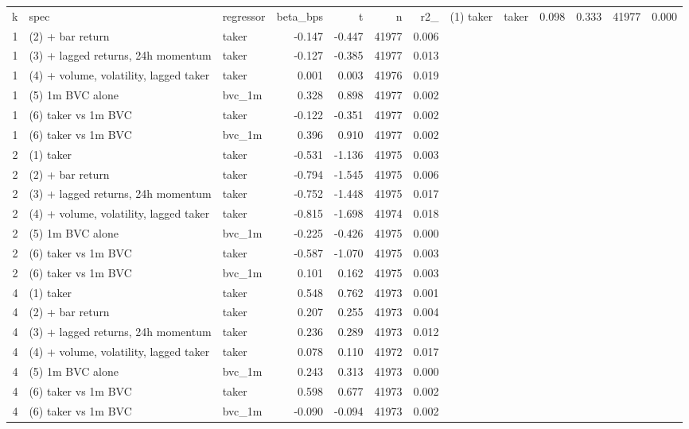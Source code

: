 \begin{tabular}{rllrrrr}
\toprule
k & spec & regressor & beta_bps & t & n & r2_%
 & (1) taker & taker & 0.098 & 0.333 & 41977 & 0.000 \\
1 & (2) + bar return & taker & -0.147 & -0.447 & 41977 & 0.006 \\
1 & (3) + lagged returns, 24h momentum & taker & -0.127 & -0.385 & 41977 & 0.013 \\
1 & (4) + volume, volatility, lagged taker & taker & 0.001 & 0.003 & 41976 & 0.019 \\
1 & (5) 1m BVC alone & bvc_1m & 0.328 & 0.898 & 41977 & 0.002 \\
1 & (6) taker vs 1m BVC & taker & -0.122 & -0.351 & 41977 & 0.002 \\
1 & (6) taker vs 1m BVC & bvc_1m & 0.396 & 0.910 & 41977 & 0.002 \\
2 & (1) taker & taker & -0.531 & -1.136 & 41975 & 0.003 \\
2 & (2) + bar return & taker & -0.794 & -1.545 & 41975 & 0.006 \\
2 & (3) + lagged returns, 24h momentum & taker & -0.752 & -1.448 & 41975 & 0.017 \\
2 & (4) + volume, volatility, lagged taker & taker & -0.815 & -1.698 & 41974 & 0.018 \\
2 & (5) 1m BVC alone & bvc_1m & -0.225 & -0.426 & 41975 & 0.000 \\
2 & (6) taker vs 1m BVC & taker & -0.587 & -1.070 & 41975 & 0.003 \\
2 & (6) taker vs 1m BVC & bvc_1m & 0.101 & 0.162 & 41975 & 0.003 \\
4 & (1) taker & taker & 0.548 & 0.762 & 41973 & 0.001 \\
4 & (2) + bar return & taker & 0.207 & 0.255 & 41973 & 0.004 \\
4 & (3) + lagged returns, 24h momentum & taker & 0.236 & 0.289 & 41973 & 0.012 \\
4 & (4) + volume, volatility, lagged taker & taker & 0.078 & 0.110 & 41972 & 0.017 \\
4 & (5) 1m BVC alone & bvc_1m & 0.243 & 0.313 & 41973 & 0.000 \\
4 & (6) taker vs 1m BVC & taker & 0.598 & 0.677 & 41973 & 0.002 \\
4 & (6) taker vs 1m BVC & bvc_1m & -0.090 & -0.094 & 41973 & 0.002 \\
\bottomrule
\end{tabular}
